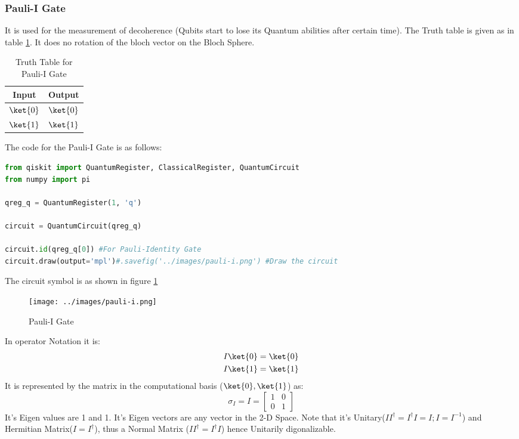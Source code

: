 \documentclass[12pt, oneside]{book}
\theoremstyle{definition}
\theoremstyle{definition}
\theoremstyle{remark}
\begin{document}
\subsubsection{Pauli-I Gate}
It is used for the measurement of decoherence (Qubits start to lose its Quantum abilities after certain time).
The Truth table is given as in table \ref{tab:pauli-i}. It does no rotation of the bloch vector on the Bloch Sphere.
\begin{table}[H]
    \centering
    \begin{tabular}{|c|c|}
        \hline
        Input & Output\\
        \hline  
        $\ket{0}$ & $\ket{0}$\\
        $\ket{1}$ & $\ket{1}$\\
        \hline
    \end{tabular}
    \caption{Truth Table for Pauli-I Gate}
    \label{tab:pauli-i}
\end{table}
The code for the Pauli-I Gate is as follows:
\begin{lstlisting}[language=Python]
from qiskit import QuantumRegister, ClassicalRegister, QuantumCircuit
from numpy import pi

qreg_q = QuantumRegister(1, 'q')

circuit = QuantumCircuit(qreg_q)

circuit.id(qreg_q[0]) #For Pauli-Identity Gate
circuit.draw(output='mpl')#.savefig('../images/pauli-i.png') #Draw the circuit
\end{lstlisting}
The circuit symbol is as shown in figure \ref{fig:pauli-i}
\begin{figure}[H]
    \centering
    \texttt{[image: ../images/pauli-i.png]}
    \caption{Pauli-I Gate}
    \label{fig:pauli-i}
\end{figure}
In operator Notation it is:
\begin{align*}
    I\ket{0}&=\ket{0} \\
    I\ket{1}&=\ket{1}
\end{align*}
It is represented by the matrix in the computational basis ($\ket{0},\ket{1}$) as:
\[
    \sigma_I=I=\begin{bmatrix}
        1 & 0 \\
        0 & 1
    \end{bmatrix}
\]
It's Eigen values are 1 and 1. It's Eigen vectors are any vector in the 2-D Space.
Note that it's Unitary($II^{\dagger}=I^{\dagger}I=I;I=I^{-1}$) and Hermitian Matrix($I=I^{\dagger}$), thus a Normal Matrix ($II^{\dagger}=I^{\dagger}I$) hence Unitarily digonalizable.
\end{document}
